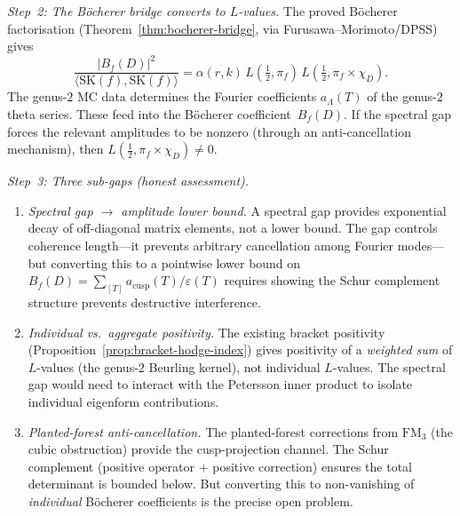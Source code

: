 \documentclass[11pt]{article}
\newcommand{\FM}{\mathrm{FM}}
\begin{document}
\emph{Step~2: The B\"ocherer bridge converts to $L$-values.}
The proved B\"ocherer factorisation
(Theorem~\ref{thm:bocherer-bridge}, via
Furusawa--Morimoto/DPSS) gives
\[
  \frac{|B_f(D)|^2}{\langle \mathrm{SK}(f), \mathrm{SK}(f)
  \rangle}
  = \alpha(r,k)\,
  L(\tfrac{1}{2}, \pi_f)\,
  L(\tfrac{1}{2}, \pi_f \times \chi_D).
\]
The genus-$2$ MC data determines the Fourier coefficients
$a_\Lambda(T)$ of the genus-$2$ theta series.  These feed
into the B\"ocherer coefficient~$B_f(D)$.  If the spectral
gap forces the relevant amplitudes to be nonzero (through
an anti-cancellation mechanism), then
$L(\tfrac{1}{2}, \pi_f \times \chi_D) \neq 0$.

\emph{Step~3: Three sub-gaps (honest assessment).}
\begin{enumerate}[label=\textup{Gap \Roman*:},leftmargin=*]
\item \emph{Spectral gap $\to$ amplitude lower bound.}
  A spectral gap provides exponential decay of off-diagonal
  matrix elements, not a lower bound.  The gap controls
  coherence length---it prevents arbitrary cancellation among
  Fourier modes---but converting this to a pointwise lower
  bound on $B_f(D) = \sum_{[T]} a_{\mathrm{cusp}}(T)/\varepsilon(T)$
  requires showing the Schur complement structure prevents
  destructive interference.
\item \emph{Individual vs.\ aggregate positivity.}
  The existing bracket positivity
  (Proposition~\ref{prop:bracket-hodge-index}) gives
  positivity of a \emph{weighted sum} of $L$-values (the
  genus-$2$ Beurling kernel), not individual $L$-values.
  The spectral gap would need to interact with the Petersson
  inner product to isolate individual eigenform contributions.
\item \emph{Planted-forest anti-cancellation.}
  The planted-forest corrections from $\FM_3$ (the cubic
  obstruction) provide the cusp-projection channel.  The Schur
  complement (positive operator $+$ positive correction)
  ensures the total determinant is bounded below.  But
  converting this to non-vanishing of \emph{individual}
  B\"ocherer coefficients is the precise open problem.
\end{enumerate}
\end{document}
